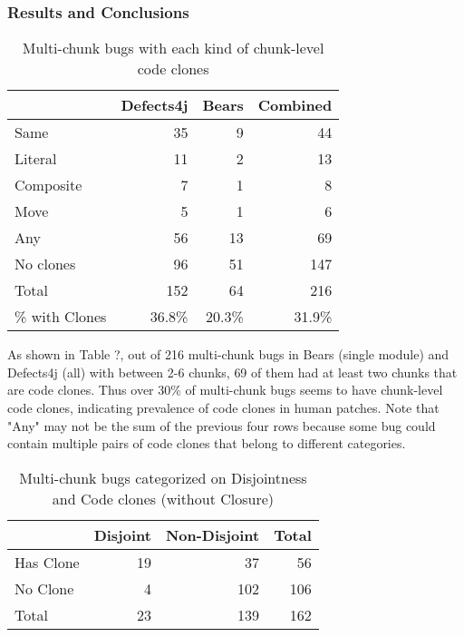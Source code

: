 \documentclass[sigconf, timestamp-false, anonymous=true]{acmart}
\begin{document}
\subsubsection{Results and Conclusions}

\begin{table}
{\begin{center}
\begin{tabular} {| l | r | r | r |}
\hline
& Defects4j & Bears & Combined \\
\hline
Same & 35 & 9 & 44  \\ 
Literal & 11 & 2 & 13  \\
Composite & 7 & 1 & 8  \\
Move & 5 & 1 & 6  \\ \hline
Any & 56 & 13 & 69  \\ \hline
No clones & 96  &  51 & 147 \\ \hline
Total & 152 & 64 & 216 \\ \hline
\% with Clones & 36.8\% & 20.3\% & 31.9\% \\ \hline
\end{tabular}
\end{center}
}
\caption{Multi-chunk bugs with each kind of chunk-level code clones}
\end{table}

As shown in Table ?, out of 216 multi-chunk bugs in Bears (single module) and Defects4j (all) with between 2-6 chunks,
69 of them had at least two chunks that are code clones. Thus over 30\% of multi-chunk bugs seems
to have chunk-level code clones, indicating prevalence of code clones in human patches. Note that "Any" may not
be the sum of the previous four rows because some bug could contain multiple pairs of code clones that
belong to different categories.

\begin{table}
{\begin{center}
\begin{tabular} {| l | r r | r |}
\hline
& Disjoint & Non-Disjoint & Total \\
\hline
Has Clone & 19 & 37 & 56 \\
No Clone & 4 & 102 & 106 \\ \hline
Total & 23 & 139 & 162 \\ \hline
\end{tabular}
\end{center}
}
\caption{Multi-chunk bugs categorized on Disjointness and Code clones (without Closure)}
\end{table}
\end{document}
